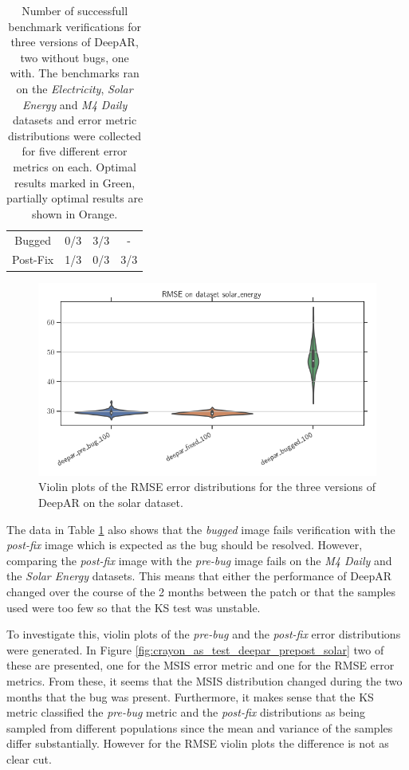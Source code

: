 \begin{table}[htb]
\begin{tabular}{cccc}
    Bugged         & \cellcolor{green}0/3  & \cellcolor{green}3/3 & -                    \\
    Post-Fix       & \cellcolor{orange}1/3 & \cellcolor{green}0/3 & \cellcolor{green}3/3 \\
    \hline
  \end{tabular}
  \caption{Number of successfull benchmark verifications for three versions of DeepAR, two without bugs, one with. The benchmarks ran on the \textit{Electricity}, \textit{Solar Energy} and \textit{M4 Daily} datasets and error metric distributions were collected for five different error metrics on each. Optimal results marked in Green, partially optimal results are shown in Orange.}
  \label{tab:crayon_for_accuracy_regressions}
\end{table}

\begin{figure}[h]
  \centering
  \includegraphics[width=\linewidth]{./img/crayon_study/RMSE_all_solar.png}
  \caption{Violin plots of the RMSE error distributions for the three versions of DeepAR on the solar dataset.}
  \label{fig:crayon_as_test_deepar_all_rmse_solar}
\end{figure}

The data in Table \ref{tab:crayon_for_accuracy_regressions} also shows that the \textit{bugged} image fails verification with the \textit{post-fix} image which is expected as the bug should be resolved. However, comparing the \textit{post-fix} image with the \textit{pre-bug} image fails on the \textit{M4 Daily} and the \textit{Solar Energy} datasets. This means that either the performance of DeepAR changed over the course of the 2 months between the patch or that the samples used were too few so that the KS test was unstable.

To investigate this, violin plots of the \textit{pre-bug} and the \textit{post-fix} error distributions were generated. In Figure \ref{fig:crayon_as_test_deepar_prepost_solar} two of these are presented, one for the MSIS error metric and one for the RMSE error metrics. From these, it seems that the MSIS distribution changed during the two months that the bug was present. Furthermore, it makes sense that the KS metric classified the \textit{pre-bug} metric and the \textit{post-fix} distributions as being sampled from different populations since the mean and variance of the samples differ substantially. However for the RMSE violin plots the difference is not as clear cut.

